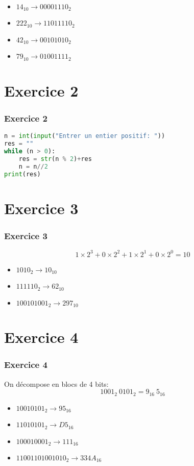 \documentclass[svgnames,11pt]{beamer}
\begin{document}
\begin{frame}
    \frametitle{}

    \begin{itemize}
        \item $14_{10} \rightarrow 00001110_2$
        \item $222_{10} \rightarrow 11011110_2$
        \item $42_{10} \rightarrow 00101010_2$
        \item $79_{10} \rightarrow 01001111_2$
    \end{itemize}

\end{frame}
\section{Exercice 2}
\begin{frame}[fragile]
    \frametitle{Exercice 2}

    \begin{center}
        \begin{lstlisting}[language=Python , basicstyle=\ttfamily\small, xleftmargin=2em, xrightmargin=2em]
n = int(input("Entrer un entier positif: "))
res = ""
while (n > 0):
    res = str(n % 2)+res
    n = n//2
print(res)
\end{lstlisting}
        \label{CODE}
    \end{center}

\end{frame}
\section{Exercice 3}
\begin{frame}
    \frametitle{Exercice 3}
    $$1×2^3+0×2^2+1×2^1+0×2^0 = 10$$
    \begin{itemize}
        \item $1010_2 \rightarrow 10_{10}$
        \item $111110_2 \rightarrow 62_{10}$
        \item $100101001_2 \rightarrow 297_{10}$
    \end{itemize}

\end{frame}
\section{Exercice 4}
\begin{frame}
    \frametitle{Exercice 4}
    On décompose en blocs de 4 bits:
    $$1001_2~0101_2 = 9_{16}~5_{16}$$
    \begin{itemize}
        \item $10010101_2 \rightarrow 95_{16}$
        \item $11010101_2 \rightarrow D5_{16}$
        \item $100010001_2 \rightarrow 111_{16}$
        \item $11001101001010_2 \rightarrow 334A_{16}$
    \end{itemize}

\end{frame}
\end{document}
